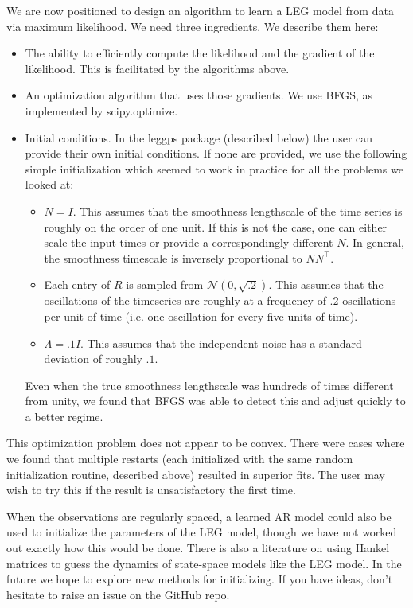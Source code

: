 \documentclass{article}
\theoremstyle{definition}
\begin{document}
We are now positioned to design an algorithm to learn a LEG model from data via maximum likelihood.  We need three ingredients.  We describe them here:

\begin{itemize}
    \item The ability to efficiently compute the likelihood and the gradient of the likelihood.  This is facilitated by the algorithms above.
    \item An optimization algorithm that uses those gradients.  We use BFGS, as implemented by scipy.optimize.  
    \item Initial conditions.  In the leggps package (described below) the user can provide their own initial conditions.  If none are provided, we use the following simple initialization which seemed to work in practice for all the problems we looked at:
    \begin{itemize}
        \item $N=I$.  This assumes that the smoothness lengthscale of the time series is roughly on the order of one unit.  If this is not the case, one can either scale the input times or provide a correspondingly different $N$.  In general, the smoothness timescale is inversely proportional to $N N^\top$.
        \item Each entry of $R$ is sampled from $\mathcal{N}(0,\sqrt{.2})$.  This assumes that the oscillations of the timeseries are roughly at a frequency of $.2$ oscillations per unit of time (i.e. one oscillation for every five units of time).
        \item $\Lambda = .1 I$.  This assumes that the independent noise has a standard deviation of roughly $.1$.  
    \end{itemize}
    Even when the true smoothness lengthscale was hundreds of times different from unity, we found that BFGS was able to detect this and adjust quickly to a better regime.
\end{itemize}

This optimization problem does not appear to be convex.  There were cases where we found that multiple restarts (each initialized with the same random initialization routine, described above) resulted in superior fits.  The user may wish to try this if the result is unsatisfactory the first time.  

When the observations are regularly spaced, a learned AR model could also be used to initialize the parameters of the LEG model, though we have not worked out exactly how this would be done.  There is also a literature on using Hankel matrices to guess the dynamics of state-space models like the LEG model.  In the future we hope to explore new methods for initializing.  If you have ideas, don't hesitate to raise an issue on the GitHub repo.
\end{document}
